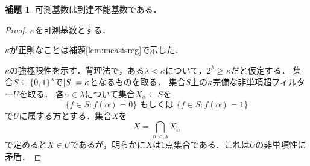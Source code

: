 \documentclass[uplatex]{jsarticle}
\DeclarePairedDelimiter\abs{\lvert}{\rvert}
\renewcommand\subset{\subseteq}
\theoremstyle{definition}
\newtheorem{lem}[thm]{補題}
\begin{document}
	\begin{lem}\label{lem:measisinacc}
		可測基数は到達不能基数である．
	\end{lem}
	\begin{proof}
		$\kappa$を可測基数とする．
		
		$\kappa$が正則なことは補題\ref{lem:measisreg}で示した．
		
		$\kappa$の強極限性を示す．背理法で，ある$\lambda < \kappa$について，$2^\lambda \ge \kappa$だと仮定する．
		集合$S \subset \{0, 1\}^\lambda$で$\abs{S} = \kappa$となるものを取る．
		集合$S$上の$\kappa$完備な非単項超フィルター$U$を取る．
		各$\alpha \in \lambda$について集合$X_\alpha \subset S$を
		\[
		\{ f \in S : f(\alpha) = 0 \} \text{ もしくは } \{ f \in S : f(\alpha) = 1 \}
		\]
		で$U$に属する方とする．集合$X$を
		\[
		X = \bigcap_{\alpha < \lambda} X_\alpha
		\]
		で定めると$X \in U$であるが，明らかに$X$は1点集合である．これは$U$の非単項性に矛盾．
	\end{proof}
	
\end{document}
